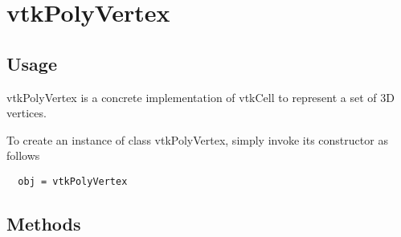 \section{vtkPolyVertex}

\subsection{Usage}

 vtkPolyVertex is a concrete implementation of vtkCell to represent a
 set of 3D vertices.

To create an instance of class vtkPolyVertex, simply
invoke its constructor as follows
\begin{verbatim}
  obj = vtkPolyVertex
\end{verbatim}
\subsection{Methods}

